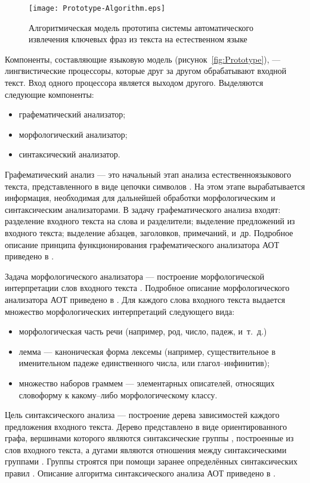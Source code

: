 \begin{figure}[ht]
  \centering
  \texttt{[image: Prototype-Algorithm.eps]}
  \caption{Алгоритмическая модель прототипа системы автоматического
извлечения ключевых фраз из текста на естественном языке}
  \label{fig:Prototype-Algorithm}
\end{figure}

Компоненты, составляющие языковую модель
(рисунок~\ref{fig:Prototype}), — лингвистические процессоры,
которые друг за другом обрабатывают входной текст. Вход одного
процессора является выходом другого. Выделяются следующие
компоненты:
\begin{itemize}
  \item графематический анализатор;
  \item морфологический анализатор;
  \item синтаксический анализатор.
\end{itemize}

Графематический анализ — это начальный этап анализа
естественноязыкового текста, представленного в виде цепочки символов
\cite{AOTGraphAn}. На этом этапе вырабатывается информация, необходимая
для дальнейшей обработки морфологическим и синтаксическим анализаторами.
В задачу графематического анализа входят: разделение входного текста на
слова и разделители; выделение предложений из входного текста; выделение
абзацев, заголовков, примечаний, и\ др. Подробное описание принципа
функционирования графематического анализатора АОТ приведено в
\cite{AOTGraphAn}.

Задача морфологического анализатора — построение морфологической
интерпретации слов входного текста \cite{Nozhov03}. Подробное описание
морфологического анализатора АОТ приведено в \cite{Sokirko04}.
Для каждого слова входного текста выдается множество морфологических
интерпретаций следующего вида:
\begin{itemize}
  \item морфологическая часть речи (например, род, число, падеж,
и\ т.\ д.)
  \item лемма — каноническая форма лексемы (например, существительное в
именительном падеже единственного числа, или глагол--инфинитив);
  \item множество наборов граммем — элементарных описателей, относящих
словоформу к какому--либо морфологическому классу.
\end{itemize}

Цель синтаксического анализа — построение дерева зависимостей
каждого предложения входного текста. Дерево представлено в виде
ориентированного графа, вершинами которого являются синтаксические
группы \cite{Levine06}, построенные из слов входного текста,
а дугами являются отношения между синтаксическими группами
\cite{Nozhov03}. Группы строятся при помощи заранее определённых
синтаксических правил \cite{Gladky85}. Описание алгоритма
синтаксического анализа АОТ приведено в \cite{Nozhov03}.

